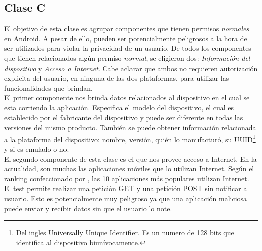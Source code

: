 \subsection{Clase C}
El objetivo de esta clase es agrupar componentes que tienen permisos \textit{normales} en Android. A pesar de ello, pueden ser potencialmente peligrosos a la hora de ser utilizados para violar la privacidad de un usuario. De todos los componentes que tienen relacionados algún permiso \textit{normal}, se eligieron dos: \emph{Información del dispositivo} y \emph{Acceso a Internet}. Cabe aclarar que ambos no requieren autorización explicita del usuario, en ninguna de las dos plataformas, para utilizar las funcionalidades que brindan.\\
El primer componente nos brinda datos relacionados al dispositivo en el cual se esta corriendo la aplicación. Especifica el modelo del dispositivo, el cual es establecido por el fabricante del dispositivo y puede ser diferente en todas las versiones del mismo producto. También se puede obtener información relacionada a la plataforma del dispositivo: nombre, versión, quién lo manufacturó, su UUID\footnote{Del ingles Universally Unique Identifier. Es un numero de 128 bits que identifica al dispositivo biunívocamente.} y si es emulado o no.\\
El segundo componente de esta clase es el que nos provee acceso a Internet. En la actualidad, son muchas las aplicaciones móviles que lo utilizan Internet. Según el ranking confeccionado por \cite{BOA}, las 10 aplicaciones más populares utilizan Internet. El test permite realizar una petición GET y una petición POST sin notificar al usuario. Esto es potencialmente muy peligroso ya que una aplicación maliciosa puede enviar y recibir datos sin que el usuario lo note. 